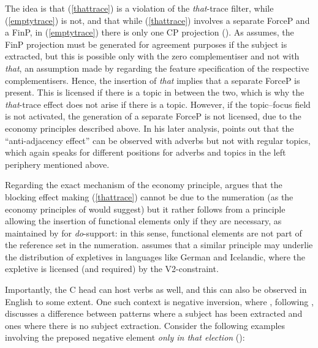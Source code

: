 The idea is that (\ref{thattrace}) is a violation of the \textit{that}-trace filter, while (\ref{emptytrace}) is not, and that while (\ref{thattrace}) involves a separate ForceP and a FinP, in (\ref{emptytrace}) there is only one CP projection (\citealt[313--314]{rizzi1997}). As \citet[313--314]{rizzi1997} assumes, the FinP projection must be generated for agreement purposes if the subject is extracted, but this is possible only with the zero complementiser and not with \textit{that}, an assumption made by \citet[312]{rizzi1997} regarding the feature specification of the respective complementisers. Hence, the insertion of \textit{that} implies that a separate ForceP is present. This is licensed if there is a topic in between the two, which is why the \textit{that}-trace effect does not arise if there is a topic. However, if the topic--focus field is not activated, the generation of a separate ForceP is not licensed, due to the economy principles described above. In his later analysis, \citet[241]{rizzi2004} points out that the ``anti-adjacency effect'' can be observed with adverbs but not with regular topics, which again speaks for different positions for adverbs and topics in the left periphery mentioned above.

Regarding the exact mechanism of the economy principle, \citet[314--315]{rizzi1997} argues that the blocking effect making (\ref{thattrace}) cannot be due to the numeration (as the economy principles of \citealt{chomsky1995} would suggest) but it rather follows from a principle allowing the insertion of functional elements only if they are necessary, as maintained by \citet{grimshaw1993} for \textit{do}-support: in this sense, functional elements are not part of the reference set in the numeration. \citet[315]{rizzi1997} assumes that a similar principle may underlie the distribution of expletives in languages like German and Icelandic, where the expletive is licensed (and required) by the V2-constraint.

Importantly, the C head can host verbs as well, and this can also be observed in English to some extent. One such context is negative inversion, where \citet{rizzi1997}, following \citet{culicover1992, culicover1993}, discusses a difference between patterns where a subject has been extracted and ones where there is no subject extraction. Consider the following examples involving the preposed negative element \textit{only in that election} (\citealt[315--316, ex. 104 and 105]{rizzi1997}):

\ea{}
\z
\z

